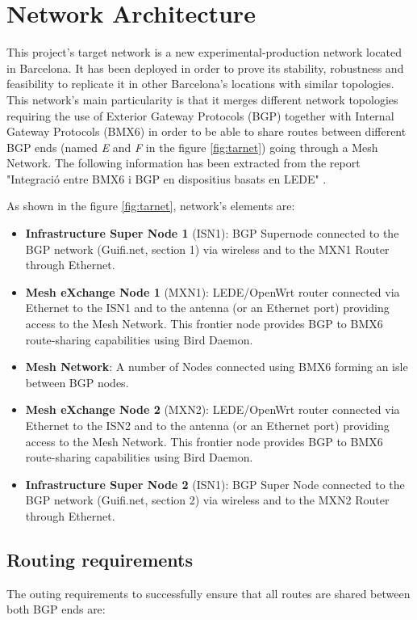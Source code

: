 \chapter{Network Architecture}
\label{ch:architecture}

This project's target network is a new experimental-production network located in Barcelona. It has been deployed in order to prove its stability, robustness and feasibility to replicate it in other Barcelona's locations with similar topologies. This network's main particularity is that it merges different network topologies requiring the use of Exterior Gateway Protocols (BGP) together with Internal Gateway Protocols (BMX6) in order to be able to share routes between different BGP ends (named \textit{E} and \textit{F} in the figure \ref{fig:tarnet}) going through a Mesh Network. The following information has been extracted from the report "Integració entre BMX6 i BGP en dispositius basats en LEDE" \cite{bgpbmx6}.

As shown in the figure \ref{fig:tarnet}, network's elements are:
\begin{itemize}
    \item \textbf{Infrastructure Super Node 1} (ISN1): BGP Supernode connected to the BGP network (Guifi.net, section 1) via wireless and to the MXN1 Router through Ethernet.     
    \item \textbf{Mesh eXchange Node 1} (MXN1): LEDE/OpenWrt router connected via Ethernet to the ISN1 and to the antenna (or an Ethernet port) providing access to the Mesh Network. This frontier node provides BGP to BMX6 route-sharing capabilities using Bird Daemon.
    \item \textbf{Mesh Network}: A number of Nodes connected using BMX6 forming an isle between BGP nodes.
    \item \textbf{Mesh eXchange Node 2} (MXN2): LEDE/OpenWrt router connected via Ethernet to the ISN2 and to the antenna (or an Ethernet port) providing access to the Mesh Network. This frontier node provides BGP to BMX6 route-sharing capabilities using Bird Daemon.
    \item \textbf{Infrastructure Super Node 2} (ISN1): BGP Super Node connected to the BGP network (Guifi.net, section 2) via wireless and to the MXN2 Router through Ethernet.
\end{itemize}


\section{Routing requirements}
The outing requirements to successfully ensure that all routes are shared between both BGP ends are:


